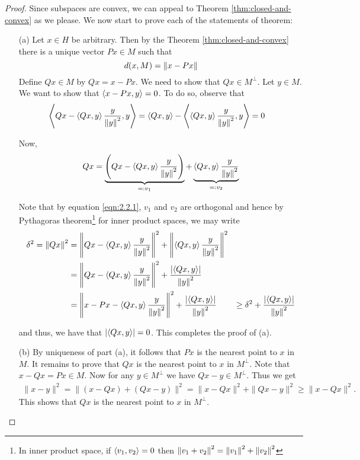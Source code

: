 \begin{proof}
    Since subspaces are convex, we can appeal to Theorem \ref{thm:closed-and-convex} as we please. We now start to prove each of the statements of theorem:
    \begin{itemize}
	\item [(a)] Let $x \in H$ be arbitrary. Then by the Theorem \ref{thm:closed-and-convex} there is a unique vector $Px \in M$ such that 
	    \begin{equation*}
		d(x, M) = \left\lVert x-Px \right\rVert
	    \end{equation*}
	    Define $Qx \in M$ by $Qx = x-Px$. We need to show that $Qx \in M^{\perp}$. Let $y \in M$. We want to show that $\left\langle x-Px , y \right\rangle = 0$. To do so, observe that
	    \begin{align}
		\left\langle Qx - \left\langle Qx,y \right\rangle \frac{y}{\left\lVert y \right\rVert^{2}},y \right\rangle&= \left\langle Qx,y \right\rangle - \left\langle \left\langle Qx,y \right\rangle \frac{y}{\left\lVert y \right\rVert^{2}},y \right\rangle
		=0
		\label{eqn:2.2.1}
	    \end{align}

	    Now, 
	    \begin{align*}
		Qx = \underbrace{\left( Qx - \left\langle Qx, y \right\rangle \frac{y}{\left\lVert y \right\rVert^{2}} \right)}_{=: v_1} + \underbrace{\left\langle Qx,y \right\rangle \frac{y}{\left\lVert y \right\rVert^{2}}}_{=:v_2}
	    \end{align*}

	    Note that by equation \ref{eqn:2.2.1}, $v_1$ and $v_2$ are orthogonal and hence by Pythagoras theorem\footnote{In inner product space, if $\left\langle v_{1}, v_{2} \right\rangle=0$ then $\left\lVert v_{1} + v_{2} \right\rVert^{2} = \left\lVert v_{1} \right\rVert^{2} + \left\lVert v_{2} \right\rVert^{2}$} for inner product spaces, we may write
\begin{align*}
    \delta ^{2} = \left\lVert Qx \right\rVert^{2} &= \left\lVert  Qx - \left\langle Qx, y \right\rangle \frac{y}{\left\lVert y \right\rVert^{2}} \right\rVert^{2} + \left\lVert \left\langle Qx,y \right\rangle \frac{y}{\left\lVert y \right\rVert^{2}} \right\rVert^{2} \\
    &= \left\lVert  Qx - \left\langle Qx, y \right\rangle \frac{y}{\left\lVert y \right\rVert^{2}} \right\rVert^{2} + \frac{\left\lvert \left\langle Qx,y \right\rangle \right\rvert}{\left\lVert y \right\rVert^{2}} \\
    &= \left\lVert  x- Px - \left\langle Qx, y \right\rangle \frac{y}{\left\lVert y \right\rVert^{2}} \right\rVert^{2} + \frac{\left\lvert \left\langle Qx,y \right\rangle \right\rvert}{\left\lVert y \right\rVert^{2}}
    &\ge \delta ^{2} +  \frac{\left\lvert \left\langle Qx,y \right\rangle \right\rvert}{\left\lVert y \right\rVert^{2}}
	    \end{align*}

	    and thus, we have that $\left\lvert \left\langle Qx,y \right\rangle \right\rvert = 0$. This completes the proof of (a).
	\item [(b)] By uniqueness of part (a), it follows that $Px$ is the nearest point to $x$ in $M$. It remains to prove that $Qx$ is the nearest point to $x$ in $M^{\perp}$. Note that $x-Qx=Px\in M.$ Now for any $y\in M^{\perp}$ we have  $Qx-y\in M^{\perp}.$ Thus we get 
	\begin{align*}
	\|x-y\|^2= \|(x-Qx) + (Qx -y)\|^2 = \|x-Qx\|^2 + \|Qx -y\|^2 \geqslant \|x-Qx\|^2.
	\end{align*}
This shows that $Qx$ is the nearest point to $x$ in $M^{\perp}.$	


\end{itemize}
\end{proof}
